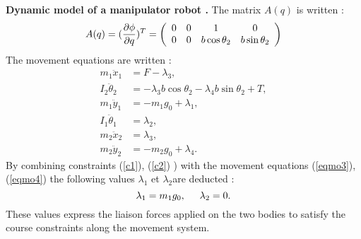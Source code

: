 \begin{exemple} {\bf Dynamic model of a manipulator robot .}
The matrix $A(q)$ is written :
$$  
A(q) = (\frac{\partial \phi}{\partial q})^{T} = \bma{cccc} 0 & 0 & 1 & 0 \\ 
0 & 0 & b\cos\theta_2 & b\sin\theta_2 \ema
$$  
The movement equations are written  :
\begin{align}
m_1\ddot x_1 &= F - \lambda_3, \label{eqmo1}\\
I_2\ddot \theta_2 &= - \lambda_3b\cos\theta_2 - \lambda_4b\sin\theta_2 
+ T, \label{eqmo2} \\ 
m_1\ddot y_1 &= - m_1g_0 + \lambda_1, \label{eqmo3}\\
I_1\ddot \theta_1 &= \lambda_2, \label{eqmo4}\\
m_2\ddot x_2 &= \lambda_3, \label{eqmo5}\\
m_2\ddot y_2 &= -m_2g_0 + \lambda_4. \label{eqmo6}
\end{align}
By combining constraints  (\ref{c1}), (\ref{c2}) ) with the movement equations
(\ref{eqmo3}), (\ref{eqmo4}) the following values  $\lambda_1$ et $\lambda_2$are deducted :
$$
\lambda_1 = m_1g_0,\hd \lambda_2 =0.
$$
These values express the liaison forces applied on the two bodies to satisfy the course constraints along the movement system. 


\end{exemple}
